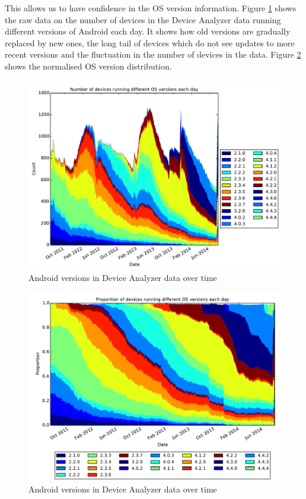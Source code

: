 \documentclass[conference,a4paper,twoside]{IEEEtran}
\begin{document}
This allows us to have confidence in the OS version information.
Figure \ref{fig:os} shows the raw data on the number of devices in the Device Analyzer data running different versions of Android each day.
It shows how old versions are gradually replaced by new ones, the long tail of devices which do not see updates to more recent versions and the fluctuation in the number of devices in the data.
Figure \ref{fig:norm_os} shows the normalised OS version distribution.
\begin{figure}
 \centering
 \includegraphics[width=\columnwidth]{figures/da_os}
 \caption{Android versions in Device Analyzer data over time}
 \label{fig:os}
\end{figure}
\begin{figure}
 \centering
 \includegraphics[width=\columnwidth]{figures/da_norm_os}
 \caption{Android versions in Device Analyzer data over time}
 \label{fig:norm_os}
\end{figure}
\end{document}
